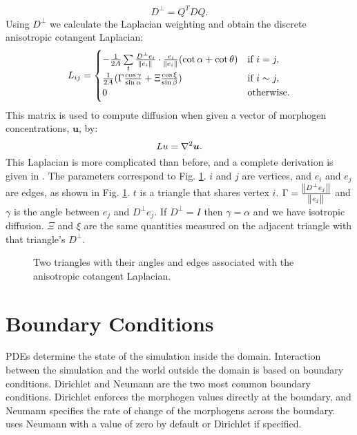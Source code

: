\begin{equation} 
	D^\perp = Q^T D Q.
\label{eq:perpTensor}
\end{equation}
Using $D^\perp$ we calculate the Laplacian weighting and obtain the discrete anisotropic cotangent Laplacian:
\begin{equation} 
   L_{ij} =
   \begin{cases} 
      -\frac{1}{2A}\sum\limits_{t} \frac{D^\perp e_i}{\norm{e_i}} \cdot \frac{e_i}{\norm{e_i}}(\cot{\alpha}+\cot{\theta})  & \text{if } i = j, \\
      \frac{1}{2A}(\Gamma \frac{\cos{\gamma}}{\sin{\alpha}} + \Xi\frac{\cos{\xi}}{\sin{\beta}})                                     & \text{if } i \sim j, \\
      0 & \text{otherwise.}
   \end{cases}
   \label{eq:anisoLaplacian}
\end{equation}
This matrix is used to compute diffusion when given a vector of morphogen concentrations, $\bm{u}$, by:
\begin{equation}
	Lu = \nabla^2 \bm{u}.
\end{equation}
This Laplacian is more complicated than before, and a complete derivation is given in \citep{mathieu2014}. The parameters correspond to Fig. \ref{fig:meshLaplacian}. $i$ and $j$ are vertices, and $e_i$ and $e_j$ are edges, as shown in Fig. \ref{fig:meshLaplacian}. $t$ is a triangle that shares vertex $i$. $\Gamma = \frac{\norm{D^\perp e_j}}{\norm{e_j}}$ and $\gamma$ is the angle between $e_j$ and $D^\perp e_j$. If $D^{\perp} = I$ then $\gamma = \alpha$ and we have isotropic diffusion. $\Xi$ and $\xi$ are the same quantities measured on the adjacent triangle with that triangle's $D^\perp$. %

\begin{figure}[H]
	\centering
	\caption{Two triangles with their angles and edges associated with the anisotropic cotangent Laplacian.}
	\label{fig:meshLaplacian}
\end{figure}

\section{Boundary Conditions}
PDEs determine the state of the simulation inside the domain. Interaction between the simulation and the world outside the domain is based on boundary conditions. Dirichlet and Neumann are the two most common boundary conditions. Dirichlet enforces the morphogen values directly at the boundary, and Neumann specifies the rate of change of the morphogens across the boundary. \ProgramName{} uses Neumann with a value of zero by default or Dirichlet if specified.


